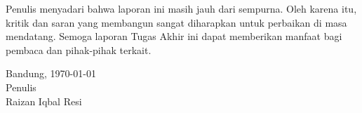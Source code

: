 Penulis menyadari bahwa laporan ini masih jauh dari sempurna. Oleh karena itu, kritik dan saran yang membangun sangat diharapkan untuk perbaikan di masa mendatang. Semoga laporan Tugas Akhir ini dapat memberikan manfaat bagi pembaca dan pihak-pihak terkait.

\begin{flushright}
    Bandung, \today\\

    Penulis \\
    \vspace{1cm}
    Raizan Iqbal Resi
\end{flushright}
